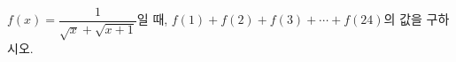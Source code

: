 \hspace*{2mm}\begin{minipage}[t]{\dimexpr\linewidth-2mm\relax}\vspace{0pt}
$f(x)=\dfrac{1}{\sqrt{x}+\sqrt{x+1}}$일 때, $f(1)+f(2)+f(3)+\cdots+f(24)$의 값을 구하시오.\end{minipage}
